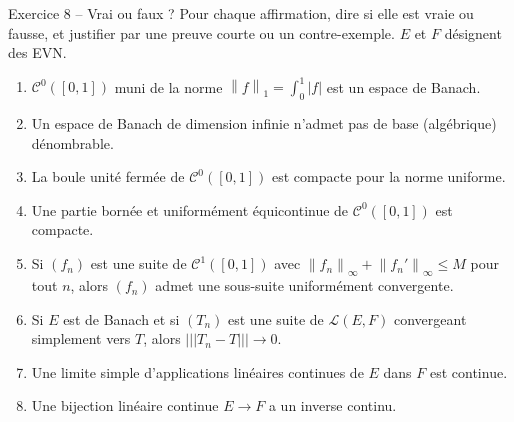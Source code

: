 \documentclass[11pt,a4paper]{article}
\newcommand{\norm}[1]{\left\|#1\right\|}
\newcommand{\opnorm}[1]{|\!|\!|#1|\!|\!|}
\newcommand{\Lc}{\mathcal{L}}
\newcommand{\Cz}{\mathcal{C}^0}
\theoremstyle{definition}
\begin{document}
\begin{exo}{Exercice 8 -- Vrai ou faux ?}
Pour chaque affirmation, dire si elle est vraie ou fausse, et justifier par une preuve courte ou un contre-exemple. $E$ et $F$ désignent des EVN.
\begin{enumerate}[label=\arabic*.]
  \item $\Cz([0,1])$ muni de la norme $\norm f_1=\int_0^1|f|$ est un espace de Banach.
  \item Un espace de Banach de dimension infinie n'admet pas de base (algébrique) dénombrable.
  \item La boule unité fermée de $\Cz([0,1])$ est compacte pour la norme uniforme.
  \item Une partie bornée et uniformément équicontinue de $\Cz([0,1])$ est compacte.
  \item Si $(f_n)$ est une suite de $\mathcal C^1([0,1])$ avec $\norm{f_n}_\infty+\norm{f_n'}_\infty\le M$ pour tout $n$, alors $(f_n)$ admet une sous-suite uniformément convergente.
  \item Si $E$ est de Banach et si $(T_n)$ est une suite de $\Lc(E,F)$ convergeant simplement vers $T$, alors $\opnorm{T_n-T}\to0$.
  \item Une limite simple d'applications linéaires continues de $E$ dans $F$ est continue.
  \item Une bijection linéaire continue $E\to F$ a un inverse continu.
\end{enumerate}
\end{exo}
\end{document}

